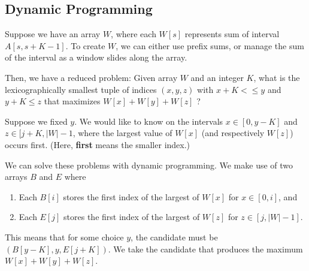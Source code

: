 \subsection{Dynamic Programming}
Suppose we have an array $W$, where each $W[s]$ represents sum of interval $A[s, s+K-1]$. To create $W$, we can either use prefix sums, or manage the sum of the interval as a window slides along the array.

Then, we have a reduced problem: Given array $W$ and an integer $K$, what is the lexicographically smallest tuple of indices $(x, y, z)$ with $x + K <\leq y$ and $y + K \leq z$ that maximizes $W[x] + W[y] + W[z]$ ?

Suppose we fixed $y$. We would like to know on the intervals $x \in [0, y-K]$ and $z \in [j+K, \lvert W\rvert-1$, where the largest value of $W[x]$ (and respectively $W[z]$) occurs first. (Here, \textbf{first} means the smaller index.)

We can solve these problems with dynamic programming. We make use of two arrays $B$ and $E$ where

\begin{enumerate}
\item Each $B[i]$ stores the first index of the largest of $W[x]$ for $x \in [0, i]$, and 
\item Each $E[j]$ stores the first index of the largest of $W[z]$ for $z \in [j, \lvert W\rvert - 1]$.
\end{enumerate}

This means that for some choice $y$, the candidate must be $(B[y-K], y, E[j+K])$. We take the candidate that produces the maximum $W[x] + W[y] + W[z]$.

